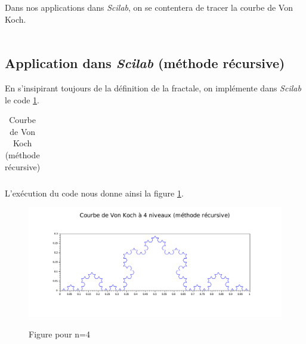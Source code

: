 \documentclass[a4paper,10pt]{report}
\begin{document}
Dans nos applications dans \textit{Scilab}, on se contentera de tracer la courbe de Von Koch. \\ \\

\subsection{Application dans \textit{Scilab} (méthode récursive)}
En s'insipirant toujours de la définition de la fractale, on implémente dans \textit{Scilab} le code \ref{code_koch}.
\begin{table}[H]
\caption{Courbe de Von Koch (méthode récursive)}
\begin{tabular}{l}
\\
\end{tabular}
\label{code_koch}
\end{table}
\newpage
L'exécution du code nous donne ainsi la figure \ref{koch_recursif}.
\begin{figure}[H]
\centering
\caption{Figure pour n=4}
\includegraphics[width=\textwidth]{koch_recursif.pdf}
\label{koch_recursif}
\end{figure}
\end{document}
